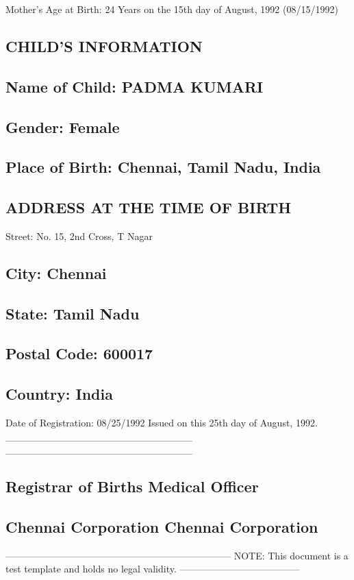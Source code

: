 Mother's Age at Birth: 24 Years on the 15th day of August, 1992 (08/15/1992)

\subsection*{CHILD'S INFORMATION}

\subsection*{Name of Child: PADMA KUMARI}

\subsection*{Gender: Female}

\subsection*{Place of Birth: Chennai, Tamil Nadu, India}

\subsection*{ADDRESS AT THE TIME OF BIRTH}

Street: No. 15, 2nd Cross, T Nagar

\subsection*{City: Chennai}

\subsection*{State: Tamil Nadu}

\subsection*{Postal Code: 600017}

\subsection*{Country: India}

Date of Registration: 08/25/1992 Issued on this 25th day of August, 1992. \_\_\_\_\_\_\_\_\_\_\_\_\_\_\_\_\_\_\_\_\_\_\_\_\_\_ \_\_\_\_\_\_\_\_\_\_\_\_\_\_\_\_\_\_\_\_\_\_\_\_\_\_

\subsection*{Registrar of Births Medical Officer}

\subsection*{Chennai Corporation Chennai Corporation}

----------------------------------------------------------------------- NOTE: This document is a test template and holds no legal validity. --------------------------------------